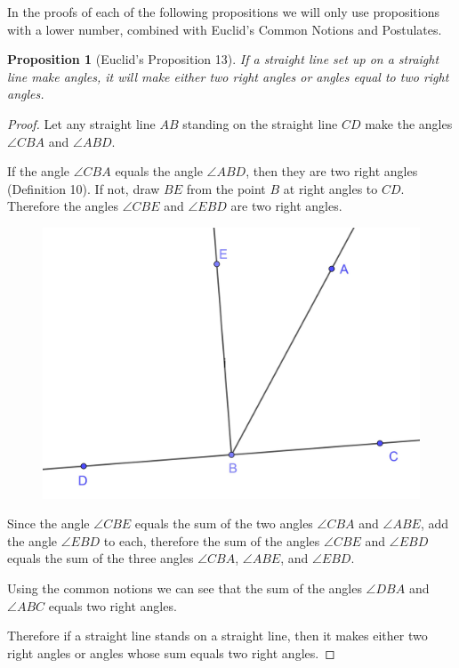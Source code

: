 \documentclass[
]{book}
\newtheorem{proposition}{Proposition}[chapter]
\theoremstyle{definition}
\theoremstyle{definition}
\theoremstyle{definition}
\theoremstyle{definition}
\theoremstyle{remark}
\begin{document}
In the proofs of each of the following propositions we will only use propositions with a lower number, combined with Euclid's Common Notions and Postulates.

\begin{proposition}[Euclid's Proposition 13]
\protect\hypertarget{prp:prop13}{}\label{prp:prop13}If a straight line set up on a straight line make angles, it will make either two right angles or angles equal to two right angles.
\end{proposition}

\begin{proof}
Let any straight line \(AB\) standing on the straight line \(CD\) make the angles \(\angle CBA\) and \(\angle ABD\).

If the angle \(\angle CBA\) equals the angle \(\angle ABD\), then they are two right angles (Definition 10). If not, draw \(BE\) from the point \(B\) at right angles to \(CD\). Therefore the angles \(\angle CBE\) and \(\angle EBD\) are two right angles.

\begin{figure}

{\centering \includegraphics[width=0.5\linewidth]{images/Prop13} 

}

\end{figure}

Since the angle \(\angle CBE\) equals the sum of the two angles \(\angle CBA\) and \(\angle ABE\), add the angle \(\angle EBD\) to each, therefore the sum of the angles \(\angle CBE\) and \(\angle EBD\) equals the sum of the three angles \(\angle CBA\), \(\angle ABE\), and \(\angle EBD\).

Using the common notions we can see that the sum of the angles \(\angle DBA\) and \(\angle ABC\) equals two right angles.

Therefore if a straight line stands on a straight line, then it makes either two right angles or angles whose sum equals two right angles.
\end{proof}
\end{document}
